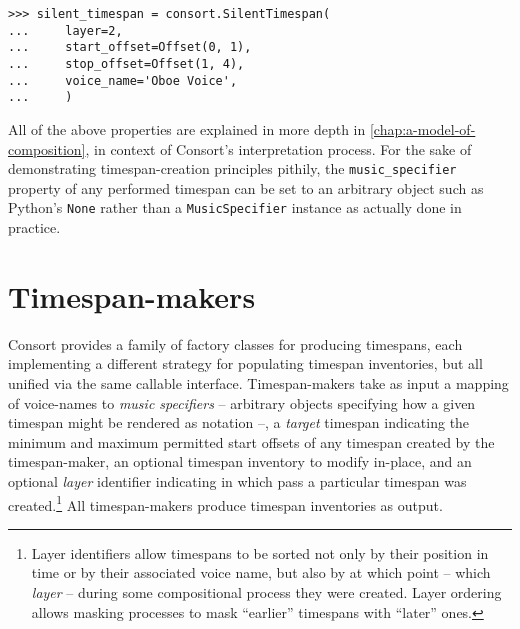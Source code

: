 \begin{abjadbookoutput}
\begin{singlespacing}
\vspace{-0.5\baselineskip}
\begin{lstlisting}
>>> silent_timespan = consort.SilentTimespan(
...     layer=2,
...     start_offset=Offset(0, 1),
...     stop_offset=Offset(1, 4),
...     voice_name='Oboe Voice',
...     )
\end{lstlisting}
\end{singlespacing}
\end{abjadbookoutput}

\noindent All of the above properties are explained in more depth in
\autoref{chap:a-model-of-composition}, in context of Consort's interpretation
process. For the sake of demonstrating timespan-creation principles pithily,
the \texttt{music\_specifier} property of any performed timespan can be set to
an arbitrary object such as Python's \texttt{None} rather than a
\texttt{MusicSpecifier} instance as actually done in practice.

\section{Timespan-makers}
\label{sec:timespan-makers}

Consort provides a family of factory classes for producing timespans, each
implementing a different strategy for populating timespan inventories, but all
unified via the same callable interface. Timespan-makers take as input a
mapping of voice-names to \emph{music specifiers} -- arbitrary objects
specifying how a given timespan might be rendered as notation --, a
\emph{target} timespan indicating the minimum and maximum permitted start
offsets of any timespan created by the timespan-maker, an optional timespan
inventory to modify in-place, and an optional \emph{layer} identifier
indicating in which pass a particular timespan was created.\footnote{Layer
identifiers allow timespans to be sorted not only by their position in time or
by their associated voice name, but also by at which point -- which
\emph{layer} -- during some compositional process they were created. Layer
ordering allows masking processes to mask \enquote{earlier} timespans with
\enquote{later} ones.} All timespan-makers produce timespan inventories as
output.

